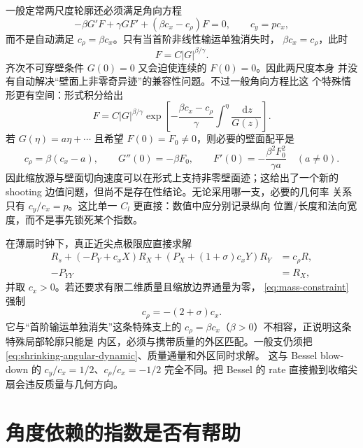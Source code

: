 \documentclass[11pt,a4paper,fontset=fandol]{ctexart}
\newcommand{\dd}{\,\mathrm d}
\newcommand{\abs}[1]{\left\lvert #1\right\rvert}
\begin{document}
一般定常两尺度轮廓还必须满足角向方程
\begin{equation}
  -\beta G'F+\gamma GF'+(\beta c_x-c_\rho)F=0,
  \qquad c_y=p c_x,
  \label{eq:shrinking-angular-dynamic}
\end{equation}
而不是自动满足 $c_\rho=\beta c_x$。只有当首阶非线性输运单独消失时，
$\beta c_x=c_\rho$，此时
\begin{equation}
  F=C\abs{G}^{\beta/\gamma}.
  \label{eq:shrinking-streamline}
\end{equation}
齐次不可穿壁条件 $G(0)=0$ 又会迫使连续的 $F(0)=0$。因此两尺度本身
并没有自动解决“壁面上非零奇异迹”的兼容性问题。不过一般角向方程比这
个特殊情形更有空间：形式积分给出
\begin{equation}
  F=C\abs{G}^{\beta/\gamma}
  \exp\!\left[-\frac{\beta c_x-c_\rho}{\gamma}
  \int^\eta\frac{\dd z}{G(z)}\right].
  \label{eq:shrinking-general-F}
\end{equation}
若 $G(\eta)=a\eta+\cdots$ 且希望 $F(0)=F_0\ne0$，则必要的壁面配平是
\begin{equation}
  c_\rho=\beta(c_x-a),
  \qquad
  G''(0)=-\beta F_0,
  \qquad
  F'(0)=-\frac{\beta^2F_0^2}{\gamma a}\quad(a\ne0).
  \label{eq:shrinking-wall-compatibility}
\end{equation}
因此缩放源与壁面切向速度可以在形式上支持非零壁面迹；这给出了一个新的
shooting 边值问题，但尚不是存在性结论。无论采用哪一支，必要的几何率
关系只有 $c_y/c_x=p$。这比单一 $C_l$ 更直接：数值中应分别记录纵向
位置/长度和法向宽度，而不是事先锁死某个指数。

在薄扇时钟下，真正近尖点极限应直接求解
\begin{align}
  R_s+(-P_Y+c_xX)R_X+(P_X+(1+\sigma)c_xY)R_Y&=c_\rho R,\\
  -P_{YY}&=R_X,
  \label{eq:shrinking-limit-system}
\end{align}
并取 $c_x>0$。若还要求有限二维质量且缩放边界通量为零，
\eqref{eq:mass-constraint} 强制
\begin{equation}
  c_\rho=-(2+\sigma)c_x.
\end{equation}
它与“首阶输运单独消失”这条特殊支上的
$c_\rho=\beta c_x$（$\beta>0$）不相容，正说明这条特殊局部轮廓只能是
内区，必须与携带质量的外区匹配。一般支仍须把
\eqref{eq:shrinking-angular-dynamic}、质量通量和外区同时求解。
这与 Bessel blow-down 的 $c_y/c_x=1/2$、$c_\rho/c_x=-1/2$
完全不同。把 Bessel 的 rate 直接搬到收缩尖扇会违反质量与几何方向。

\section{角度依赖的指数是否有帮助}
\end{document}
